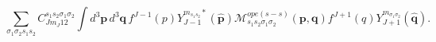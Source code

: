 \begin{equation}
\underset{\sigma _{1}\sigma _{2}s_{1}s_{2}}{\sum }C_{Jm_{J}12}^{s_{1}s_{2}%
\sigma _{1}\sigma _{2}}\int d^{3}\mathbf{p\,}d^{3}\mathbf{q\,}%
f^{J-1}(p)Y_{J-1}^{m_{s_{1}s_{2}}\ast }(\hat{\mathbf{p}})\mathcal{M}%
_{s_{1}s_{2}\sigma _{1}\sigma _{2}}^{ope\left( s-s\right) }\left( \mathbf{p,q%
}\right) f^{J+1}(q)Y_{J+1}^{m_{\sigma _{1}\sigma _{2}}}(\hat{\mathbf{q}}%
).
\end{equation}

